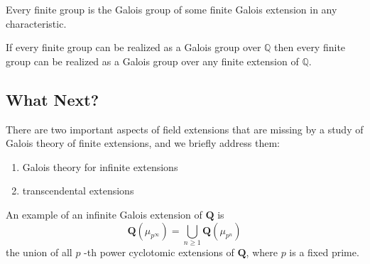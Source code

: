 \begin{theorem}[Theorem 8.1]
Every finite group is the Galois group of some finite Galois extension in any characteristic.
\end{theorem}
\begin{theorem}[Theorem 8.2]
If every finite group can be realized as a Galois group over $\mathbb{Q}$ then every finite group can be realized as a Galois group over any finite extension of $\mathbb{Q}$.
\end{theorem}
\subsection{What Next?}

There are two important aspects of field extensions that are missing by a study of Galois theory of finite extensions, and we briefly address them:

\begin{enumerate}
	\item Galois theory for infinite extensions
	\item transcendental extensions
\end{enumerate}

An example of an infinite Galois extension of $\mathbf{Q}$ is
\[
\mathbf{Q}(\mu_{p^{\infty}})=\bigcup_{n\geq 1}\mathbf{Q}(\mu_{p^{n}})
\]
the union of all $p$ -th power cyclotomic extensions of $\mathbf{Q}$, where $p$ is a fixed prime.
